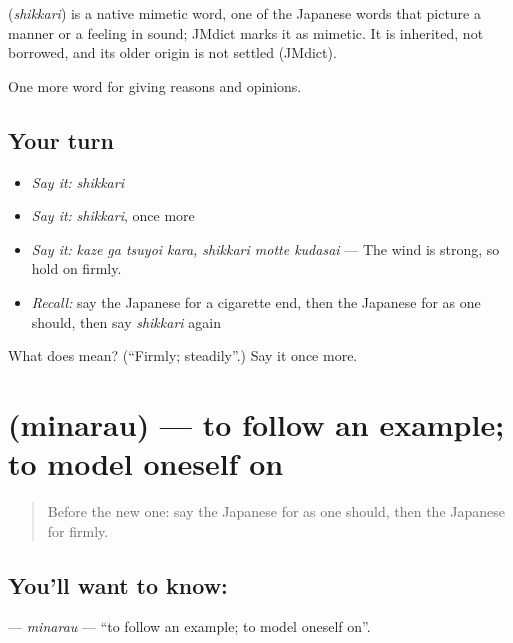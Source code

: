 \begin{cousinweb}
\textbf{} (\emph{shikkari}) is a native mimetic word, one of the Japanese words that picture a manner or a feeling in sound; JMdict marks it as mimetic. It is inherited, not borrowed, and its older origin is not settled (JMdict).
\end{cousinweb}

\begin{grammarlens}[title={What you've built}]
One more word for giving reasons and opinions.
\end{grammarlens}

\subsection*{Your turn}
\begin{itemize}
\raggedright
  \item \emph{Say it:} \emph{shikkari}
  \item \emph{Say it:} \emph{shikkari}, once more
  \item \emph{Say it:} \emph{kaze ga tsuyoi kara, shikkari motte kudasai} — The wind is strong, so hold on firmly.
  \item \emph{Recall:} say the Japanese for a cigarette end, then the Japanese for as one should, then say \emph{shikkari} again
\end{itemize}

\begin{tcolorbox}[breakable,colback=teal!4,colframe=teal!35!black,title={Before you move on}]
What does  mean? (\textquotedblleft{}Firmly; steadily\textquotedblright{}.) Say it once more.
\end{tcolorbox}
\section[\texorpdfstring{\ja{みならう} (minarau)}{みならう (minarau)}]{ (minarau) — to follow an example; to model oneself on}

\label{lesson:JA-C330-minarau}



\begin{quote}
Before the new one: say the Japanese for as one should, then the Japanese for firmly.
\end{quote}

\subsection*{You'll want to know: }
\textbf{} — \emph{minarau} — \textquotedblleft{}to follow an example; to model oneself on\textquotedblright{}.

